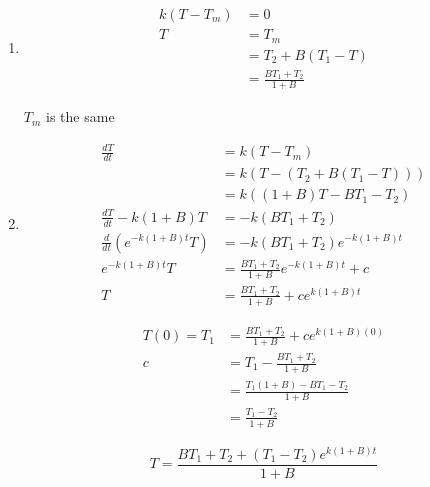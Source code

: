 \documentclass{article}
\begin{document}
\begin{enumerate}
  \item

        \begin{align*}
          k (T - T_m) & = 0                         \\
          T           & = T_m                       \\
                      & = T_2 + B(T_1 - T)          \\
                      & = \frac{B T_1 + T_2}{1 + B}
        \end{align*}

        $T_m$ is the same

  \item

        \begin{align*}
          \frac{dT}{dt}                     & = k (T - T_m)                                    \\
                                            & = k (T - (T_2 + B (T_1 - T)))                    \\
                                            & = k ((1 + B) T - B T_1 - T_2)                    \\
          \frac{dT}{dt} - k (1 + B) T       & = -k (B T_1 + T_2)                               \\
          \frac{d}{dt} (e^{-k (1 + B) t} T) & = -k (B T_1 + T_2) e^{-k (1 + B) t}              \\
          e^{-k (1 + B) t} T                & = \frac{B T_1 + T_2}{1 + B} e^{-k (1 + B) t} + c \\
          T                                 & = \frac{B T_1 + T_2}{1 + B} + c e^{k (1 + B) t}
        \end{align*}

        \begin{align*}
          T(0) = T_1 & = \frac{B T_1 + T_2}{1 + B} + c e^{k (1 + B) (0)} \\
          c          & = T_1 - \frac{B T_1 + T_2}{1 + B}                 \\
                     & = \frac{T_1 (1 + B) - B T_1 - T_2}{1 + B}         \\
                     & = \frac{T_1 - T_2}{1 + B}
        \end{align*}

        \[T = \frac{B T_1 + T_2 + (T_1 - T_2) e^{k (1 + B) t}}{1 + B}\]
\end{enumerate}
\end{document}
